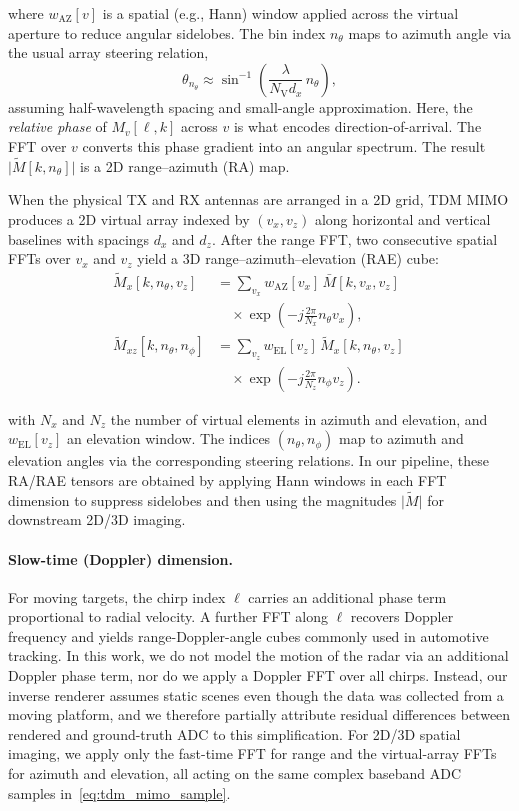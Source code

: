where $w_\text{AZ}[v]$ is a spatial (e.g., Hann) window applied across the virtual aperture to reduce angular sidelobes. The bin index $n_\theta$ maps to azimuth angle via the usual array steering relation,
\begin{equation}
    \theta_{n_\theta}
    \approx \sin^{-1}\!\left(
        \frac{\lambda}{N_\text{V} d_x}\, n_\theta
    \right),
\end{equation}
assuming half-wavelength spacing and small-angle approximation. Here, the \emph{relative phase} of $M_v[\ell,k]$ across $v$ is what encodes direction-of-arrival. The FFT over $v$ converts this phase gradient into an angular spectrum. The result $\lvert \widetilde{M}[k,n_\theta]\rvert$ is a 2D range--azimuth (RA) map.

When the physical TX and RX antennas are arranged in a 2D grid, TDM MIMO produces a 2D virtual array indexed by $(v_x,v_z)$ along horizontal and vertical baselines with spacings $d_x$ and $d_z$. After the range FFT, two consecutive spatial FFTs over $v_x$ and $v_z$ yield a 3D range--azimuth--elevation (RAE) cube:
\begin{align}
\widetilde{M}_x[k,n_\theta,v_z]
&=
\sum_{v_x} w_\text{AZ}[v_x]\,
    \bar{M}[k,v_x,v_z]\,
    \nonumber\\
&\quad\times
    \exp\!\left(
        -j \frac{2\pi}{N_x} n_\theta v_x
    \right),
\label{eq:mx_fft}
\\[0.3em]
\widetilde{M}_{xz}[k,n_\theta,n_\phi]
&=
\sum_{v_z} w_\text{EL}[v_z]\,
    \widetilde{M}_x[k,n_\theta,v_z]\,
    \nonumber\\
&\quad\times
    \exp\!\left(
        -j \frac{2\pi}{N_z} n_\phi v_z
    \right).
\label{eq:mxz_fft}
\end{align}

with $N_x$ and $N_z$ the number of virtual elements in azimuth and elevation, and $w_\text{EL}[v_z]$ an elevation window. The indices $(n_\theta,n_\phi)$ map to azimuth and elevation angles via the corresponding steering relations. In our pipeline, these RA/RAE tensors are obtained by applying Hann windows in each FFT dimension to suppress sidelobes and then using the magnitudes $\lvert \widetilde{M} \rvert$ for downstream 2D/3D imaging.

\paragraph{Slow-time (Doppler) dimension.}
For moving targets, the chirp index $\ell$ carries an additional phase term proportional to radial velocity. A further FFT along $\ell$ recovers Doppler frequency and yields range-Doppler-angle cubes commonly used in automotive tracking. In this work, we do not model the motion of the radar via an additional Doppler phase term, nor do we apply a Doppler FFT over all chirps. Instead, our inverse renderer assumes static scenes even though the data was collected from a moving platform, and we therefore partially attribute residual differences between rendered and ground-truth ADC to this simplification. For 2D/3D spatial imaging, we apply only the fast-time FFT for range and the virtual-array FFTs for azimuth and elevation, all acting on the same complex baseband ADC samples in~\eqref{eq:tdm_mimo_sample}.

